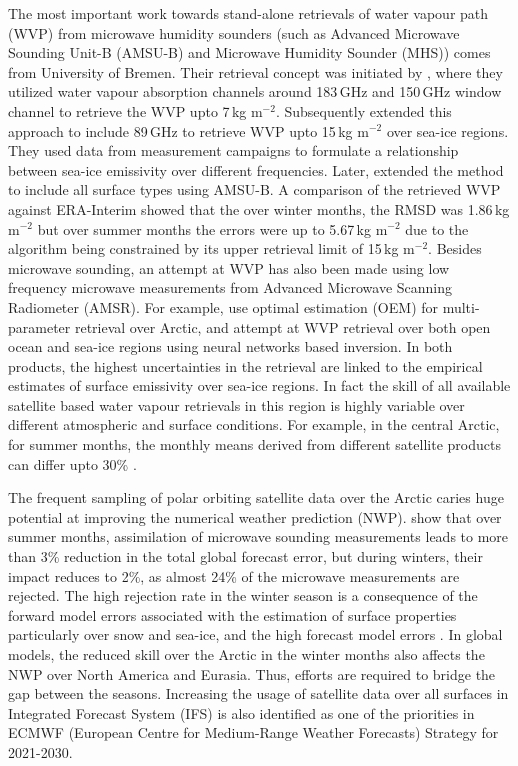 \documentclass[12pt,oneside,a4paper]{article}
\begin{document}
The most important work towards stand-alone retrievals of water vapour path (WVP) from microwave humidity sounders (such as Advanced Microwave
Sounding Unit-B (AMSU-B) and Microwave Humidity Sounder (MHS)) comes from
University of Bremen. Their retrieval concept was initiated by
\citet{miao:2001:atmos}, where they utilized water vapour absorption channels
around 183\,GHz and 150\,GHz window channel to retrieve the WVP upto 7\,kg m$^{-2}$. Subsequently \citet{melsheimer:2008:impro} extended this approach to include 89\,GHz to retrieve WVP upto 15\,kg m$^{-2}$ over sea-ice regions. They used data from measurement campaigns to formulate a relationship between sea-ice emissivity over different frequencies. Later,
\citet{scarlat:2018:retri} extended the method to include all surface types
using AMSU-B. A comparison of the retrieved WVP against ERA-Interim showed that the over winter months, the RMSD was 1.86\,kg m$^{-2}$ but over summer months the errors were up to 5.67\,kg m$^{-2}$ due to the algorithm being constrained by its upper retrieval limit of 15\,kg m$^{-2}$. Besides microwave sounding, an attempt at WVP has also been made using low frequency microwave measurements from Advanced Microwave Scanning Radiometer (AMSR). For example, \citet{scarlat:2017:exper} use optimal estimation (OEM) for multi-parameter retrieval over Arctic, and \citet{zabolotskikh:2020:anadv} attempt at WVP retrieval over both open ocean and sea-ice regions using neural networks based inversion. In both products, the highest uncertainties in the retrieval are linked to the empirical estimates of surface emissivity over sea-ice regions. In fact the skill of all available satellite based water vapour retrievals in this region is highly variable over different atmospheric and surface conditions. For example, in the central Arctic, for summer months, the monthly means derived from different satellite products can differ upto 30\% \citep{crewell:2021:asyst}.

The frequent sampling of polar orbiting satellite data over the Arctic caries huge potential at improving the numerical weather prediction (NWP). \citet{lawrence:2019:usean} show that over summer months, assimilation of microwave sounding measurements leads to more than 3\% reduction in the total global forecast error, but during winters, their impact reduces to 2\%, as almost 24\% of the microwave measurements are rejected. The high rejection rate in the winter season is a consequence of the forward model errors associated with the estimation of surface properties particularly over snow and sea-ice, and the high forecast model errors \citep{bauer:2016:aspec}. In global models, the reduced skill over the Arctic in the winter months also affects the NWP over North America and Eurasia. Thus, efforts are required to bridge the gap between the seasons. Increasing the usage of satellite data over all surfaces in Integrated Forecast System (IFS) is also identified as one of the priorities in ECMWF (European Centre for Medium-Range Weather Forecasts) Strategy for 2021-2030.
\end{document}
